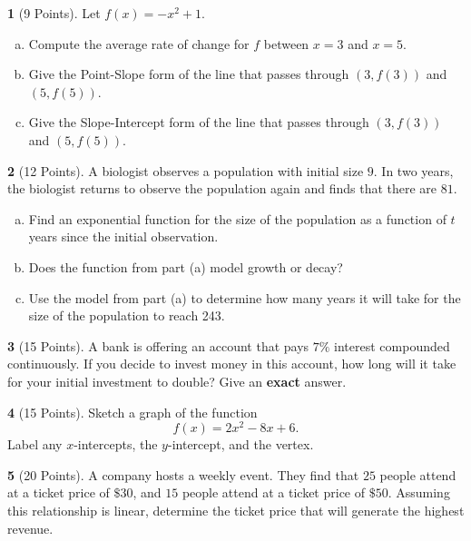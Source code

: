 \documentclass[12pt]{amsart}
\theoremstyle{definition}
\newtheorem{thm}{}
\theoremstyle{definition}
\begin{document}
\newpage
\begin{thm}[9 Points]\label{ex9}
    Let $f(x) = -x^2 + 1$.
  \begin{enumerate}[(a)]
  \item
    Compute the average rate of change for $f$ between $x = 3$ and $x = 5$.
    \vspace{2in}
  \item
    Give the Point-Slope form of the line that passes through $(3, f(3))$ and $(5, f(5))$.
    \vspace{2in}
  \item
    Give the Slope-Intercept form of the line that passes through $(3, f(3))$ and $(5, f(5))$.
  \end{enumerate}
\end{thm}

\newpage

\begin{thm}[12 Points]\label{ex9}
  A biologist observes a population with initial size $9$.
  In two years, the biologist returns to observe the population again and finds that there are $81$.
  \begin{enumerate}[(a)]
  \item
    Find an exponential function for the size of the population as a function of $t$ years since the initial observation.
    \vspace{2in}
  \item
    Does the function from part (a) model growth or decay?
    \vspace{2in}
  \item
    Use the model from part (a) to determine how many years it will take for the size of the population to reach 243.
  \end{enumerate}
\end{thm}

\newpage

\begin{thm}[15 Points]
  A bank is offering an account that pays $7\%$ interest compounded continuously.
  If you decide to invest money in this account, how long will it take for your initial investment to double?
  Give an {\bf exact} answer.
\end{thm}
\newpage

\begin{thm}[15 Points]
  Sketch a graph of the function
  $$f(x) = 2x^2 - 8x + 6.$$
  Label any $x$-intercepts, the $y$-intercept, and the vertex.
\end{thm}
\newpage

\begin{thm}[20 Points]\label{ex9}
  A company hosts a weekly event.
  They find that $25$ people attend at a ticket price of $\$30$, and $15$ people attend at a ticket price of $\$50$.
  Assuming this relationship is linear, determine the ticket price that will generate the highest revenue.
\end{thm}
\end{document}
